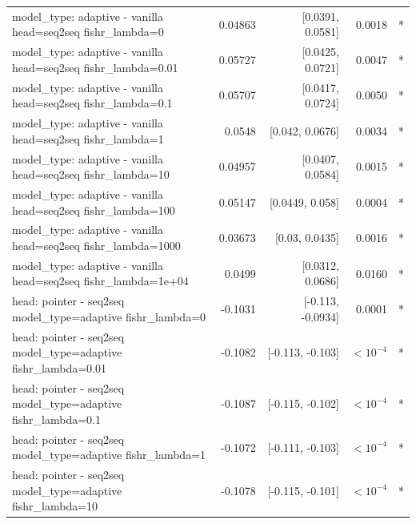 \documentclass[10pt]{article}
\makeatletter
\newcommand{\stackcell}[1]{\begin{tabular}[t]{@{}l@{}}#1\end{tabular}}
\makeatother
\begin{document}
{\begin{longtable}{lrrrl}
\stackcell{model\_type: adaptive - vanilla\\\footnotesize head=seq2seq fishr\_lambda=0 } & 0.04863 & [0.0391, 0.0581] & 0.0018 & *\\
\stackcell{model\_type: adaptive - vanilla\\\footnotesize head=seq2seq fishr\_lambda=0.01 } & 0.05727 & [0.0425, 0.0721] & 0.0047 & *\\
\stackcell{model\_type: adaptive - vanilla\\\footnotesize head=seq2seq fishr\_lambda=0.1 } & 0.05707 & [0.0417, 0.0724] & 0.0050 & *\\
\stackcell{model\_type: adaptive - vanilla\\\footnotesize head=seq2seq fishr\_lambda=1 } & 0.0548 & [0.042, 0.0676] & 0.0034 & *\\
\stackcell{model\_type: adaptive - vanilla\\\footnotesize head=seq2seq fishr\_lambda=10 } & 0.04957 & [0.0407, 0.0584] & 0.0015 & *\\
\stackcell{model\_type: adaptive - vanilla\\\footnotesize head=seq2seq fishr\_lambda=100 } & 0.05147 & [0.0449, 0.058] & 0.0004 & *\\
\stackcell{model\_type: adaptive - vanilla\\\footnotesize head=seq2seq fishr\_lambda=1000 } & 0.03673 & [0.03, 0.0435] & 0.0016 & *\\
\stackcell{model\_type: adaptive - vanilla\\\footnotesize head=seq2seq fishr\_lambda=1e+04 } & 0.0499 & [0.0312, 0.0686] & 0.0160 & *\\
\stackcell{head: pointer - seq2seq\\\footnotesize model\_type=adaptive fishr\_lambda=0 } & -0.1031 & [-0.113, -0.0934] & 0.0001 & *\\
\stackcell{head: pointer - seq2seq\\\footnotesize model\_type=adaptive fishr\_lambda=0.01 } & -0.1082 & [-0.113, -0.103] & $<10^{-4}$ & *\\
\stackcell{head: pointer - seq2seq\\\footnotesize model\_type=adaptive fishr\_lambda=0.1 } & -0.1087 & [-0.115, -0.102] & $<10^{-4}$ & *\\
\stackcell{head: pointer - seq2seq\\\footnotesize model\_type=adaptive fishr\_lambda=1 } & -0.1072 & [-0.111, -0.103] & $<10^{-4}$ & *\\
\stackcell{head: pointer - seq2seq\\\footnotesize model\_type=adaptive fishr\_lambda=10 } & -0.1078 & [-0.115, -0.101] & $<10^{-4}$ & *\\

\end{longtable}}
\end{document}

